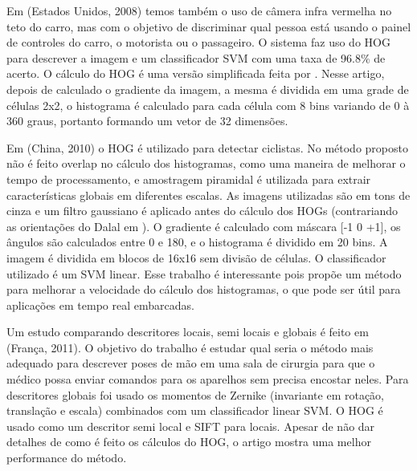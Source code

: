 
Em \cite{ref5} (Estados Unidos, 2008) temos também o uso de câmera infra vermelha no teto do carro, mas com o objetivo de discriminar qual pessoa está usando o painel de controles do carro, o motorista ou o passageiro. O sistema faz uso do HOG para descrever a imagem e um classificador SVM com uma taxa de 96.8\% de acerto. O cálculo do HOG é uma versão simplificada feita por \cite{dalal}. Nesse artigo, depois de calculado o gradiente da imagem, a mesma é dividida em uma grade de células 2x2, o histograma é calculado para cada célula com 8 bins variando de 0 à 360 graus, portanto formando um vetor de 32 dimensões.

Em \cite{ref6} (China, 2010) o HOG é utilizado para detectar ciclistas. No método proposto não é feito overlap no cálculo dos histogramas, como uma maneira de melhorar o tempo de processamento, e amostragem piramidal é utilizada para extrair características globais em diferentes escalas. As imagens utilizadas são em tons de cinza e um filtro gaussiano é aplicado antes do cálculo dos HOGs (contrariando as orientações do Dalal em \cite{dalal}). O gradiente é calculado com máscara [-1 0 +1], os ângulos são calculados entre 0 e 180, e o histograma é dividido em 20 bins. A imagem é dividida em blocos de 16x16 sem divisão de células. O classificador utilizado é um SVM linear. Esse trabalho é interessante pois propõe um método para melhorar a velocidade do cálculo dos histogramas, o que pode ser útil para aplicações em tempo real embarcadas.

Um estudo comparando descritores locais, semi locais e globais é feito em \cite{ref7} (França, 2011). O objetivo do trabalho é estudar qual seria o método mais adequado para descrever poses de mão em uma sala de cirurgia para que o médico possa enviar comandos para os aparelhos sem precisa encostar neles. Para descritores globais foi usado os momentos de Zernike (invariante em rotação, translação e escala) combinados com um classificador linear SVM. O HOG é usado como um descritor semi local e SIFT para locais. Apesar de não dar detalhes de como é feito os cálculos do HOG, o artigo mostra uma melhor performance do método.

